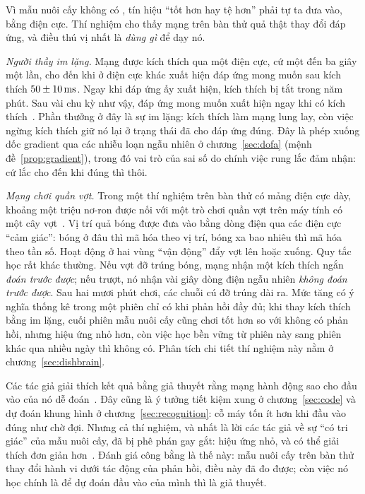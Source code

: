 Vì mẫu nuôi cấy không có , tín hiệu ``tốt hơn hay tệ hơn'' phải tự ta đưa vào, bằng điện cực. Thí nghiệm cho thấy mạng trên bàn thử quả thật thay đổi đáp ứng, và điều thú vị nhất là \emph{dùng gì} để dạy nó.

\emph{Người thầy im lặng.} Mạng được kích thích qua một điện cực, cứ một đến ba giây một lần, cho đến khi ở điện cực khác xuất hiện đáp ứng mong muốn sau kích thích $50\pm10\,\text{ms}$. Ngay khi đáp ứng ấy xuất hiện, kích thích bị tắt trong năm phút. Sau vài chu kỳ như vậy, đáp ứng mong muốn xuất hiện ngay khi có kích thích~\cite{Shahaf2001}. Phần thưởng ở đây là sự im lặng: kích thích làm mạng lung lay, còn việc ngừng kích thích giữ nó lại ở trạng thái đã cho đáp ứng đúng. Đây là phép xuống dốc gradient qua các nhiễu loạn ngẫu nhiên ở chương~\ref{sec:dofa} (mệnh đề~\ref{prop:gradient}), trong đó vai trò của sai số do chính việc rung lắc đảm nhận: cứ lắc cho đến khi đúng thì thôi.

\emph{Mạng chơi quần vợt.} Trong một thí nghiệm trên bàn thử có mảng điện cực dày, khoảng một triệu nơ-ron được nối với một trò chơi quần vợt trên máy tính có một cây vợt~\cite{Kagan2022}. Vị trí quả bóng được đưa vào bằng dòng điện qua các điện cực ``cảm giác'': bóng ở đâu thì mã hóa theo vị trí, bóng xa bao nhiêu thì mã hóa theo tần số. Hoạt động ở hai vùng ``vận động'' đẩy vợt lên hoặc xuống. Quy tắc học rất khác thường. Nếu vợt đỡ trúng bóng, mạng nhận một kích thích ngắn \emph{đoán trước được}; nếu trượt, nó nhận vài giây dòng điện ngẫu nhiên \emph{không đoán trước được}. Sau hai mươi phút chơi, các chuỗi cú đỡ trúng dài ra. Mức tăng có ý nghĩa thống kê trong một phiên chỉ có khi phản hồi đầy đủ; khi thay kích thích bằng im lặng, cuối phiên mẫu nuôi cấy cũng chơi tốt hơn so với không có phản hồi, nhưng hiệu ứng nhỏ hơn, còn việc học bền vững từ phiên này sang phiên khác qua nhiều ngày thì không có. Phân tích chi tiết thí nghiệm này nằm ở chương~\ref{sec:dishbrain}.

Các tác giả giải thích kết quả bằng giả thuyết rằng mạng hành động sao cho đầu vào của nó dễ đoán~\cite{Friston2010}. Đây cũng là ý tưởng tiết kiệm xung ở chương~\ref{sec:code} và dự đoán khung hình ở chương~\ref{sec:recognition}: cỗ máy tốn ít hơn khi đầu vào đúng như chờ đợi. Nhưng cả thí nghiệm, và nhất là lời các tác giả về sự ``có tri giác'' của mẫu nuôi cấy, đã bị phê phán gay gắt: hiệu ứng nhỏ, và có thể giải thích đơn giản hơn~\cite{Balci2023}. Đánh giá công bằng là thế này: mẫu nuôi cấy trên bàn thử thay đổi hành vi dưới tác động của phản hồi, điều này đã đo được; còn việc nó học chính là để dự đoán đầu vào của mình thì là giả thuyết.

